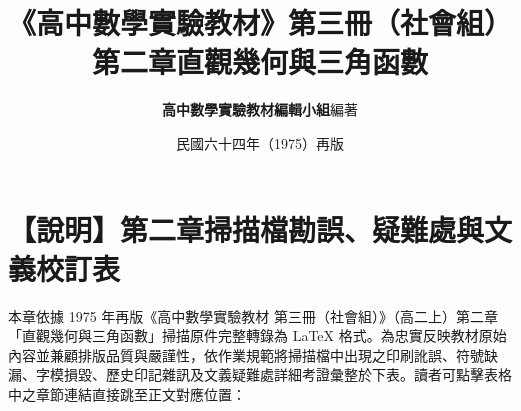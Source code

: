 \documentclass[a4paper,12pt,twoside]{article}
\title{\LARGE\textbf{《高中數學實驗教材》第三冊（社會組）}\\[0.5em] \Large\textbf{第二章\quad 直觀幾何與三角函數}}
\author{\textbf{高中數學實驗教材編輯小組}\quad 編著}
\date{民國六十四年（1975）再版}
\begin{document}
\maketitle
\thispagestyle{firstpage}

\section*{【說明】第二章掃描檔勘誤、疑難處與文義校訂表}
\label{sec:errata_notes_b3_ch2}
\label{sec:current_errata}

本章依據 1975 年再版《高中數學實驗教材 第三冊（社會組）》（高二上）第二章「直觀幾何與三角函數」掃描原件完整轉錄為 \LaTeX{} 格式。為忠實反映教材原始內容並兼顧排版品質與嚴謹性，依作業規範將掃描檔中出現之印刷訛誤、符號缺漏、字模損毀、歷史印記雜訊及文義疑難處詳細考證彙整於下表。讀者可點擊表格中之章節連結直接跳至正文對應位置：
\end{document}
